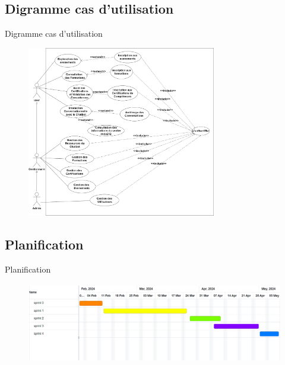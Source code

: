 \documentclass{beamer}
\begin{document}
\subsection{Digramme cas d'utilisation}
\begin{frame}{Digramme cas d'utilisation}
 \begin{figure}[htpb]
        \centering
        \includegraphics[height=7.5cm]{pic/usecase.png}
    \end{figure}
\end{frame}

\subsection{Planification}
\begin{frame}{Planification}
 
 \begin{figure}[htpb]
        \centering
        \includegraphics[height=3.5cm]{pic/gant-prev.png}
    \end{figure}
\end{frame}
\end{document}
